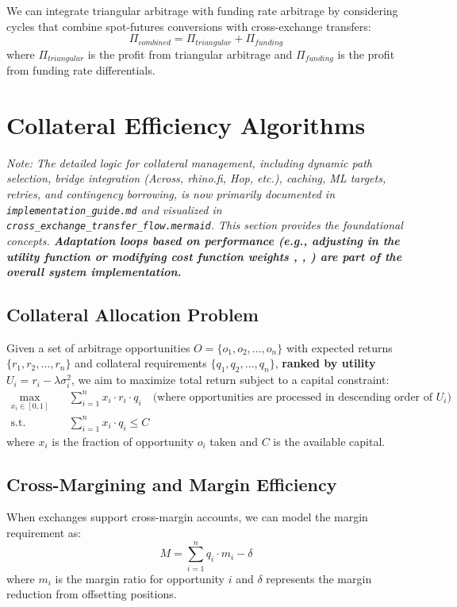\documentclass{article}
\begin{document}
We can integrate triangular arbitrage with funding rate arbitrage by considering cycles that combine spot-futures conversions with cross-exchange transfers:
\begin{equation}
\Pi_{combined} = \Pi_{triangular} + \Pi_{funding}
\end{equation}
where $\Pi_{triangular}$ is the profit from triangular arbitrage and $\Pi_{funding}$ is the profit from funding rate differentials.

\section{Collateral Efficiency Algorithms}
\textit{Note: The detailed logic for collateral management, including dynamic path selection, bridge integration (Across, rhino.fi, Hop, etc.), caching, ML targets, retries, and contingency borrowing, is now primarily documented in \texttt{implementation\_guide.md} and visualized in \texttt{cross\_exchange\_transfer\_flow.mermaid}. This section provides the foundational concepts. \textbf{Adaptation loops based on performance (e.g., adjusting \lambda in the utility function or modifying cost function weights \alpha, \beta, \gamma) are part of the overall system implementation.}}

\subsection{Collateral Allocation Problem}

Given a set of arbitrage opportunities $O = \{o_1, o_2, \ldots, o_n\}$ with expected returns $\{r_1, r_2, \ldots, r_n\}$ and collateral requirements $\{q_1, q_2, \ldots, q_n\}$, \textbf{ranked by utility $U_i = r_i - \lambda \sigma_i^2$}, we aim to maximize total return subject to a capital constraint:
\begin{align}
\max_{x_i \in [0,1]} \quad & \sum_{i=1}^n x_i \cdot r_i \cdot q_i \quad \text{(where opportunities are processed in descending order of $U_i$)} \\
\text{s.t.} \quad & \sum_{i=1}^n x_i \cdot q_i \leq C
\end{align}
where $x_i$ is the fraction of opportunity $o_i$ taken and $C$ is the available capital.

\subsection{Cross-Margining and Margin Efficiency}

When exchanges support cross-margin accounts, we can model the margin requirement as:
\begin{equation}
M = \sum_{i=1}^n q_i \cdot m_i - \delta
\end{equation}
where $m_i$ is the margin ratio for opportunity $i$ and $\delta$ represents the margin reduction from offsetting positions.
\end{document}
